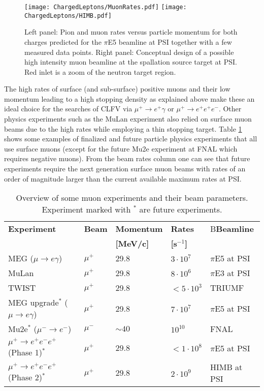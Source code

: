 \begin{figure}[ht]
\texttt{[image: ChargedLeptons/MuonRates.pdf]}\hfill
\texttt{[image: ChargedLeptons/HIMB.pdf]}
\caption{Left panel: Pion and muon rates versus particle momentum for both charges predicted for the $\pi$E5 beamline at PSI together with a few measured data points. Right panel: Conceptual design of a possible high intensity muon beamline at the spallation source target at PSI. Red inlet is a zoom of the neutron target region.\label{fig:cl:muonrates}}
\end{figure}

The high rates of surface (and sub-surface) positive muons and their low momentum leading to a high stopping density as explained above make these an ideal choice for the searches of CLFV via $\mu^+\to e^+ \gamma$ or $\mu^+ \to e^+ e^+ e^-$. Other physics experiments such as the MuLan experiment \cite{Tishchenko:2012ie} also relied on surface muon beams due to the high rates while employing a thin stopping target. Table \ref{table:cl:muonexperiments} shows some examples of finalized and future particle physics experiments that all use surface muons (except for the future Mu2e experiment at FNAL which requires negative muons). From the beam rates column one can see that future experiments require the next generation surface muon beams with rates of an order of magnitude larger than the current available maximum rates at PSI. 

\begin{table}[ht]
\begin{center}
\caption{Overview of some muon experiments and their beam parameters. Experiment marked with $^*$ are future experiments.\label{table:cl:muonexperiments}}
{ \begin{tabular}{lllll}\\
\hline
{\bf Experiment} & {\bf Beam} & {\bf Momentum} & {\bf Rates} & B{\bf Beamline}\\
{\bf } & {\bf } & {\bf [MeV/c]} & {\bf [s$^{-1}$]} & \\
\hline
MEG ($\mu\to e\gamma$) \cite{Adam:2013} & $\mu^+$ & 29.8 & $3 \cdot 10^7$ & $\pi$E5 at PSI\\
\hline
MuLan \cite{Tishchenko:2012ie} & $\mu^+$ & 29.8 & $8 \cdot 10^6$ & $\pi$E3 at PSI\\
\hline
TWIST \cite{Hillairet:2012} & $\mu^+$ & 29.8 & $<5 \cdot 10^3$ & TRIUMF\\
\hline
MEG upgrade$^*$ ($\mu\to e\gamma$) \cite{Baldini:2013ke} & $\mu^+$ & 29.8 & $7 \cdot 10^7$ & $\pi$E5 at PSI\\
\hline
Mu2e$^*$ ($\mu^- \to e^-$) \cite{Abrams:2012er} & $\mu^-$ & $\sim 40$ & $10^{10}$ & FNAL\\
\hline
$\mu^+ \to e^+e^-e^+$ (Phase 1)$^*$ \cite{Blondel:2013ia} & $\mu^+$ & $29.8$ & $<1 \cdot 10^8$ & $\pi$E5 at PSI\\
\hline
$\mu^+ \to e^+e^-e^+$ (Phase 2)$^*$ \cite{Blondel:2013ia} & $\mu^+$ & $29.8$ & $2 \cdot 10^9$ & HIMB at PSI\\
\hline
\end{tabular}}
\end{center}
\end{table}


